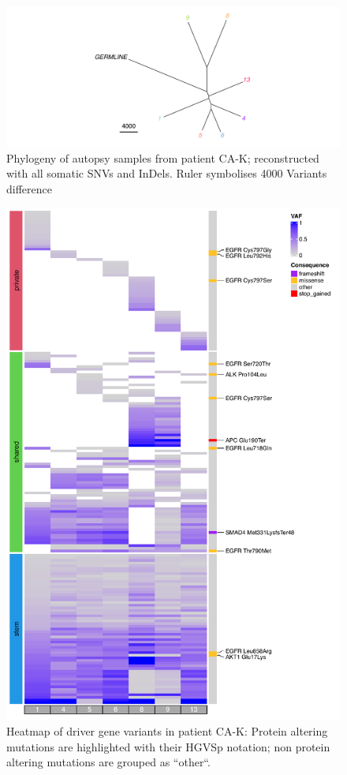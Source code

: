 \begin{figure}[ht]
	\centering
	\includegraphics[width=.99\linewidth]{Figures/CASCADE/CA82/CA82phylo.pdf}
	\caption[Phylogeny of autopsy samples from patient CA-K]{Phylogeny of autopsy samples from patient CA-K; reconstructed with all somatic SNVs and InDels. Ruler symbolises 4000 Variants difference} \label{fig:ca82phylo}
\end{figure}


\begin{figure}[ht]
\centering
\includegraphics[width=.99\linewidth]{Figures/CASCADE/CA82/CA82varHeatmap.pdf}
\caption[Heatmap of driver gene variants in patient CA-K]{Heatmap of driver gene variants in patient CA-K: Protein altering mutations are highlighted with their HGVSp notation; non protein altering mutations are grouped as ``other``.} \label{fig:cas82heatmap}
\end{figure}


